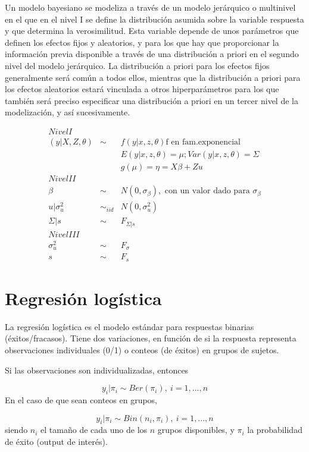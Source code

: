 \documentclass[
]{book}
\begin{document}
Un modelo bayesiano se modeliza a través de un modelo jerárquico o multinivel en el que en el nivel I se define la distribución asumida sobre la variable respuesta y que determina la verosimilitud. Esta variable depende de unos parámetros que definen los efectos fijos y aleatorios, y para los que hay que proporcionar la información previa disponible a través de una distribución a priori en el segundo nivel del modelo jerárquico. La distribución a priori para los efectos fijos generalmente será común a todos ellos, mientras que la distribución a priori para los efectos aleatorios estará vinculada a otros hiperparámetros para los que también será preciso especificar una distribución a priori en un tercer nivel de la modelización, y así sucesivamente.

\begin{eqnarray*}
Nivel I &&\\
( y | X, Z, \theta) &\sim & f(y|x,z,\theta) \text{f en fam.exponencial}\\
&& E(y|x,z,\theta)=\mu; Var(y|x,z,\theta)=\Sigma \\
&& g(\mu)=\eta=X\beta + Z u \\
Nivel II &&\\
\beta &\sim & N(0,\sigma_{\beta}), \text{ con un valor dado  para } \sigma_{\beta} \\
u|\sigma_u^2 &\sim_{iid}&  N(0,{\sigma_u^2}) \\
\Sigma|s &\sim& F_{\Sigma|s} \\
Nivel III &&\\
\sigma_u^2 &\sim&  F_{\sigma} \\
s &\sim&  F_{s}
\end{eqnarray*}

\hypertarget{regresiuxf3n-loguxedstica}{%
\section{Regresión logística}\label{regresiuxf3n-loguxedstica}}

La regresión logística es el modelo estándar para respuestas binarias (éxitos/fracasos). Tiene dos variaciones, en función de si la respuesta representa observaciones individuales (0/1) o conteos (de éxitos) en grupos de sujetos.

Si las observaciones son individualizadas, entonces

\[y_i|\pi_i \sim Ber(\pi_i), \ i=1,...,n\]
En el caso de que sean conteos en grupos,

\[y_i|\pi_i\sim Bin(n_i,\pi_i), \ i=1,...,n\]
siendo \(n_i\) el tamaño de cada uno de los \(n\) grupos disponibles, y \(\pi_i\) la probabilidad de éxito (output de interés).
\end{document}

